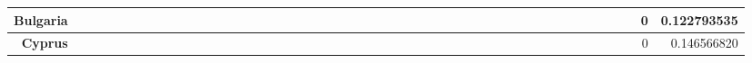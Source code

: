 \documentclass[a4paper,11pt]{report}
\begin{document}
\begin{appendices}
\begin{landscape}
\begin{longtable}{r|r|r|r|r|r|r|r|r|r|r|r|r|r|r|r|r|r|r|r|r|r|r|r|r|r|r|r|r|r|r|r|r|r|r|r|r|r|r|r|r|r|r|r|r|r|r|}
\multicolumn{1}{|r|}{\textbf{Bulgaria}}              &                  &                  &                  &                     &                  &                  &                                &                   &                  &                 &                         &                  &                  &                           &                  &                 &                  &                 &                  &                  &                  &                 &                 &                    &                &                  &                     &                 &                 &                   &                  &                 &                 &                   &                   &                &                 &                      &                          &                 &                  &                         &                 &                & 0                        & 0.122793535        \\ \hline
\multicolumn{1}{|r|}{\textbf{Cyprus}}                &                  &                  &                  &                     &                  &                  &                                &                   &                  &                 &                         &                  &                  &                           &                  &                 &                  &                 &                  &                  &                  &                 &                 &                    &                &                  &                     &                 &                 &                   &                  &                 &                 &                   &                   &                &                 &                      &                          &                 &                  &                         &                 &                & 0                        & 0.146566820        \\ \hline

\end{longtable}
\end{landscape}
\end{appendices}
\end{document}
